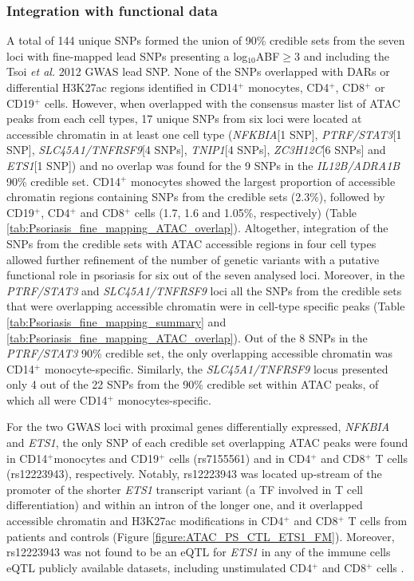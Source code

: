 \subsubsection{Integration with functional data}

A total of 144 unique SNPs formed the union of 90\% credible sets from the seven loci with fine-mapped lead SNPs presenting a log$_{10}$ABF$\geq$3 and including the Tsoi \textit{et al.} 2012 GWAS lead SNP. None of the SNPs overlapped with DARs or differential H3K27ac regions identified in CD14$^+$ monocytes, CD4$^+$, CD8$^+$ or CD19$^+$ cells. However, when overlapped with the consensus master list of ATAC peaks from each cell types, 17 unique SNPs from six loci were located at accessible chromatin in at least one cell type (\textit{NFKBIA}[1 SNP], \textit{PTRF/STAT3}[1 SNP], \textit{SLC45A1/TNFRSF9}[4 SNPs], \textit{TNIP1}[4 SNPs], \textit{ZC3H12C}[6 SNPs] and \textit{ETS1}[1 SNP]) and no overlap was found for the 9 SNPs in the \textit{IL12B/ADRA1B} 90\% credible set. CD14$^+$ monocytes showed the largest proportion of accessible chromatin regions containing SNPs from the credible sets (2.3\%), followed by CD19$^+$, CD4$^+$ and CD8$^+$ cells (1.7, 1.6 and 1.05\%, respectively) (Table \ref{tab:Psoriasis_fine_mapping_ATAC_overlap}). Altogether, integration of the SNPs from the credible sets with ATAC accessible regions in four cell types allowed further refinement of the number of genetic variants with a putative functional role in psoriasis for six out of the seven analysed loci. Moreover, in the \textit{PTRF/STAT3} and \textit{SLC45A1/TNFRSF9} loci all the SNPs from the credible sets that were overlapping accessible chromatin were in cell-type specific peaks (Table \ref{tab:Psoriasis_fine_mapping_summary} and \ref{tab:Psoriasis_fine_mapping_ATAC_overlap}). Out of the 8 SNPs in the \textit{PTRF/STAT3} 90\% credible set, the only overlapping accessible chromatin was CD14$^+$ monocyte-specific. Similarly, the \textit{SLC45A1/TNFRSF9} locus presented only 4 out of the 22 SNPs from the 90\% credible set within ATAC peaks, of which all were CD14$^+$ monocytes-specific.   

For the two GWAS loci with proximal genes differentially expressed, \textit{NFKBIA} and \textit{ETS1}, the only SNP of each credible set overlapping ATAC peaks were found in CD14$^+$monocytes and CD19$^+$ cells (rs7155561) and in CD4$^+$ and CD8$^+$ T cells (rs12223943), respectively. Notably, rs12223943 was located up-stream of the promoter of the shorter \textit{ETS1} transcript variant (a TF involved in T cell differentiation) and within an intron of the longer one, and it overlapped accessible chromatin and H3K27ac modifications in CD4$^+$ and CD8$^+$ T cells from patients and controls (Figure \ref{figure:ATAC_PS_CTL_ETS1_FM}). Moreover, rs12223943 was not found to be an eQTL for \textit{ETS1} in any of the immune cells eQTL publicly available datasets, including unstimulated CD4$^+$ and CD8$^+$ cells \parencite{Kasela2017}.


